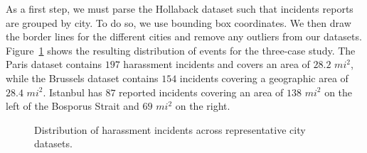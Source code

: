 \documentclass{acm_proc_article-sp}
\begin{document}
As a first step, we must parse the Hollaback dataset such that incidents reports are grouped by city. To do so, we use bounding box coordinates. We then draw the border lines for the different cities and remove any outliers from our datasets. Figure~\ref{fig:citiesDistribution} shows the resulting distribution of events for the three-case study. The Paris dataset contains $197$ harassment incidents and covers an area of $28.2$ $mi^2$, while the Brussels dataset contains $154$ incidents covering a geographic area of $28.4$ $mi^2$. Istanbul has $87$ reported incidents covering an area of $138$ $mi^2$ on the left of the Bosporus Strait and $69$ $mi^2$ on the right. \par
\begin{figure}[!h]
\centering
{}\par\medskip
{}\par\medskip     
{}
\caption{Distribution of harassment incidents across representative city datasets.}
\label{fig:citiesDistribution}
\end{figure}
\end{document}

